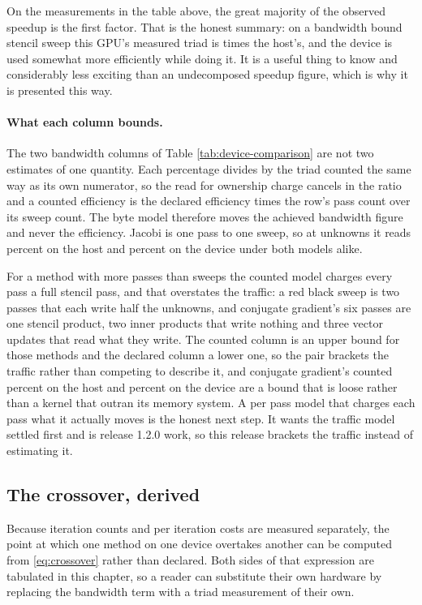 On the measurements in the table above, the great majority of the observed
speedup is the first factor. That is the honest summary: on a bandwidth bound
stencil sweep this GPU's measured triad is \pnlDeviceOverHostTriad{} times the
host's, and the device is used somewhat more efficiently while doing it. It is a
useful thing to know and considerably less exciting than an undecomposed speedup
figure, which is why it is presented this way.

\paragraph{What each column bounds.} The two bandwidth columns of Table
\ref{tab:device-comparison} are not two estimates of one quantity. Each
percentage divides by the triad counted the same way as its own numerator, so
the read for ownership charge cancels in the ratio and a counted efficiency is
the declared efficiency times the row's pass count over its sweep count. The
byte model therefore moves the achieved bandwidth figure and never the
efficiency. Jacobi is one pass to one sweep, so at \pnlDeviceSize{} unknowns it
reads \pnlJacobiHostEfficiency{} percent on the host and
\pnlJacobiDeviceEfficiency{} percent on the device under both models alike.

For a method with more passes than sweeps the counted model charges every pass a
full stencil pass, and that overstates the traffic: a red black sweep is two
passes that each write half the unknowns, and conjugate gradient's six passes are
one stencil product, two inner products that write nothing and three vector
updates that read what they write. The counted column is an upper bound for those
methods and the declared column a lower one, so the pair brackets the traffic
rather than competing to describe it, and conjugate gradient's counted
\pnlCgHostCounted{} percent on the host and \pnlCgDeviceCounted{} percent on the
device are a bound that is loose rather than a kernel that outran its memory
system. A per pass model that charges each pass what it actually moves is the
honest next step. It wants the traffic model settled first and is release 1.2.0
work, so this release brackets the traffic instead of estimating it.



\subsection{The crossover, derived}

Because iteration counts and per iteration costs are measured separately, the
point at which one method on one device overtakes another can be computed from
\eqref{eq:crossover} rather than declared. Both sides of that expression are
tabulated in this chapter, so a reader can substitute their own hardware by
replacing the bandwidth term with a triad measurement of their own.

